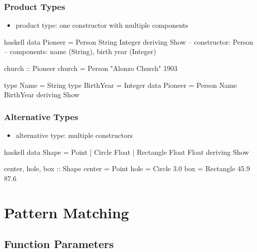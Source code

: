 \documentclass[dvipsnames]{beamer}
\theoremstyle{plain}
\begin{document}
\begin{frame}[fragile]
  \frametitle{Product Types}

  \begin{itemize}
    \item product type: one constructor with multiple components
  \end{itemize}

  \begin{exampleblock}{}
    \begin{pygments}{haskell}
data Pioneer = Person String Integer
               deriving Show
-- constructor: Person
-- components: name (String), birth year (Integer)

church :: Pioneer
church = Person "Alonzo Church" 1903

type Name = String
type BirthYear = Integer
data Pioneer = Person Name BirthYear
               deriving Show
    \end{pygments}
  \end{exampleblock}
\end{frame}

\begin{frame}[fragile]
  \frametitle{Alternative Types}

  \begin{itemize}
    \item alternative type: multiple constructors
  \end{itemize}

  \begin{exampleblock}{}
    \begin{pygments}{haskell}
data Shape = Point |
             Circle Float |
             Rectangle Float Float
             deriving Show

center, hole, box :: Shape
center = Point
hole = Circle 3.0
box = Rectangle 45.9 87.6
    \end{pygments}
  \end{exampleblock}
\end{frame}

\section{Pattern Matching}

\subsection{Function Parameters}
\end{document}
